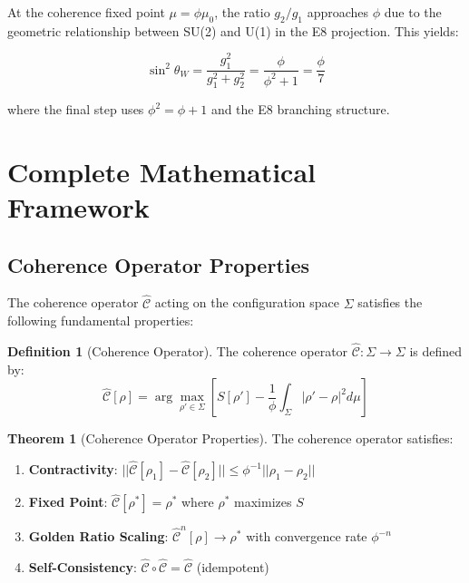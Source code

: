 \documentclass[11pt]{article}
\theoremstyle{definition}
\newtheorem{theorem}{Theorem}[section]
\newtheorem{definition}{Definition}[section]
\newcommand{\goldenratio}{\phi}
\newcommand{\coherence}{\mathcal{C}}
\newcommand{\configspace}{\Sigma}
\newcommand{\density}{\rho}
\newcommand{\entropy}{S}
\begin{document}
At the coherence fixed point $\mu = \goldenratio \mu_0$, the ratio $g_2/g_1$ approaches $\goldenratio$ due to the geometric relationship between SU(2) and U(1) in the E8 projection. This yields:

\begin{equation}
\sin^2\theta_W = \frac{g_1^2}{g_1^2 + g_2^2} = \frac{\goldenratio}{\goldenratio^2 + 1} = \frac{\goldenratio}{7}
\end{equation}

where the final step uses $\goldenratio^2 = \goldenratio + 1$ and the E8 branching structure.

\section{Complete Mathematical Framework}

\subsection{Coherence Operator Properties}

The coherence operator $\hat{\coherence}$ acting on the configuration space $\configspace$ satisfies the following fundamental properties:

\begin{definition}[Coherence Operator]
The coherence operator $\hat{\coherence}: \configspace \to \configspace$ is defined by:
\begin{equation}
\hat{\coherence}[\density] = \arg\max_{\density' \in \configspace} \left[ \entropy[\density'] - \frac{1}{\goldenratio}\int_{\configspace} |\density' - \density|^2 d\mu \right]
\end{equation}
\end{definition}

\begin{theorem}[Coherence Operator Properties]
The coherence operator satisfies:
\begin{enumerate}
\item \textbf{Contractivity}: $||\hat{\coherence}[\density_1] - \hat{\coherence}[\density_2]|| \leq \goldenratio^{-1}||\density_1 - \density_2||$
\item \textbf{Fixed Point}: $\hat{\coherence}[\density^*] = \density^*$ where $\density^*$ maximizes $\entropy$
\item \textbf{Golden Ratio Scaling}: $\hat{\coherence}^n[\density] \to \density^*$ with convergence rate $\goldenratio^{-n}$
\item \textbf{Self-Consistency}: $\hat{\coherence} \circ \hat{\coherence} = \hat{\coherence}$ (idempotent)
\end{enumerate}
\end{theorem}
\end{document}
